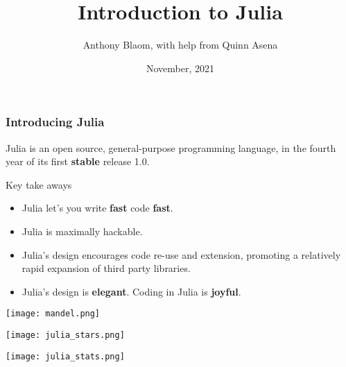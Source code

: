 \documentclass[t]{beamer}
\title{\color{Maroon} Introduction to Julia}
\date{November, 2021}
\author{Anthony Blaom, with help from Quinn Asena}
\newcommand\df{\bf\color{Maroon}}
\begin{document}



\begin{frame}
        \titlepage
\end{frame}

\begin{frame}
  \frametitle{Introducing Julia}
  Julia is an open source, general-purpose programming language, in
  the fourth year of its first {\df stable} release 1.0.\pause

  \begin{block}{Key take aways}
    \begin{itemize}
    \item Julia let's you write {\df fast}
      code {\df fast}.\pause
    \item Julia is maximally hackable.\pause
    \item Julia's design encourages code re-use and extension,
      promoting a relatively rapid expansion of third party libraries.\pause
  \item Julia's design is {\df elegant}. Coding in Julia is {\df joyful}.
  \end{itemize}
  \end{block}
\end{frame}

\begin{frame}[plain]
     \texttt{[image: mandel.png]}
\end{frame}

\begin{frame}[plain]
     \texttt{[image: julia\_stars.png]}
\end{frame}



\begin{frame}[plain]
     \texttt{[image: julia\_stats.png]}
\end{frame}
\end{document}
